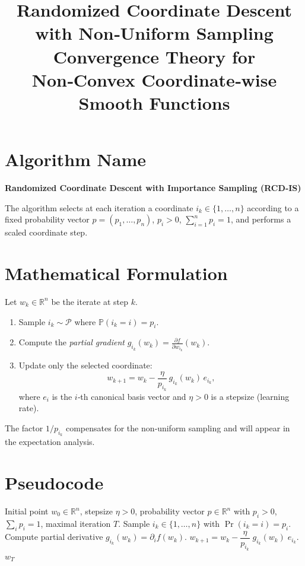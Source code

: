 \documentclass{article}
\title{Randomized Coordinate Descent with Non‑Uniform Sampling\\
Convergence Theory for Non‑Convex Coordinate‑wise Smooth Functions}
\author{}
\date{}
\newcommand{\RR}{\mathbb{R}}
\begin{document}
\maketitle

\section*{Algorithm Name}
\textbf{Randomized Coordinate Descent with Importance Sampling (RCD‑IS)}  

The algorithm selects at each iteration a coordinate $i_k\in\{1,\dots,n\}$ according to a fixed probability vector $p=(p_1,\dots,p_n)$, $p_i>0$, $\sum_{i=1}^n p_i=1$, and performs a scaled coordinate step.

\section*{Mathematical Formulation}
Let $w_k\in\RR^{n}$ be the iterate at step $k$.
\begin{enumerate}
\item Sample $i_k\sim\mathcal{P}$ where $\mathbb{P}(i_k=i)=p_i$.
\item Compute the \emph{partial gradient} $\displaystyle g_{i_k}(w_k)=\frac{\partial f}{\partial w_{i_k}}(w_k)$.
\item Update only the selected coordinate:
\[
w_{k+1}=w_k-\frac{\eta}{p_{i_k}}\,g_{i_k}(w_k)\,e_{i_k},
\tag{1}
\]
where $e_{i}$ is the $i$‑th canonical basis vector and $\eta>0$ is a stepsize (learning rate).
\end{enumerate}
The factor $1/p_{i_k}$ compensates for the non‑uniform sampling and will appear in the expectation analysis.

\section*{Pseudocode}
\begin{algorithm}[H]
\caption{RCD‑IS}
\begin{algorithmic}[1]
\REQUIRE Initial point $w_0\in\RR^n$, stepsize $\eta>0$, probability vector $p\in\RR^n$ with $p_i>0$, $\sum_i p_i=1$, maximal iteration $T$.
    \STATE Sample $i_k\in\{1,\dots,n\}$ with $\Pr(i_k=i)=p_i$.
    \STATE Compute partial derivative $g_{i_k}(w_k)=\partial_i f(w_k)$.
    \STATE $w_{k+1}=w_k-\dfrac{\eta}{p_{i_k}}\;g_{i_k}(w_k)\;e_{i_k}$.
\ENDFOR
\RETURN $w_T$
\end{algorithmic}
\end{algorithm}
\end{document}
